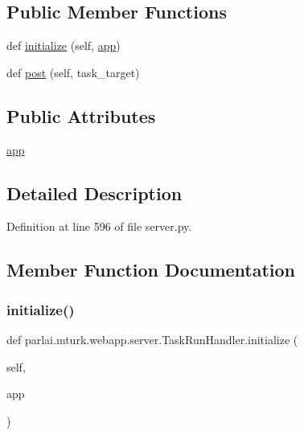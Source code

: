 \subsection*{Public Member Functions}
\begin{DoxyCompactItemize}
\item 
def \hyperlink{classparlai_1_1mturk_1_1webapp_1_1server_1_1TaskRunHandler_a110db01a938080c447a64b5a70918e25}{initialize} (self, \hyperlink{classparlai_1_1mturk_1_1webapp_1_1server_1_1TaskRunHandler_ae9e57d3ffed2fe707e9b1b041e65c2b7}{app})
\item 
def \hyperlink{classparlai_1_1mturk_1_1webapp_1_1server_1_1TaskRunHandler_a957a29eb2fcfec6fba5890470387e1d0}{post} (self, task\+\_\+target)
\end{DoxyCompactItemize}
\subsection*{Public Attributes}
\begin{DoxyCompactItemize}
\item 
\hyperlink{classparlai_1_1mturk_1_1webapp_1_1server_1_1TaskRunHandler_ae9e57d3ffed2fe707e9b1b041e65c2b7}{app}
\end{DoxyCompactItemize}


\subsection{Detailed Description}


Definition at line 596 of file server.\+py.



\subsection{Member Function Documentation}
\mbox{\label{classparlai_1_1mturk_1_1webapp_1_1server_1_1TaskRunHandler_a110db01a938080c447a64b5a70918e25}} 
\subsubsection{\texorpdfstring{initialize()}{initialize()}}
{\footnotesize\ttfamily def parlai.\+mturk.\+webapp.\+server.\+Task\+Run\+Handler.\+initialize (\begin{DoxyParamCaption}\item[{}]{self,  }\item[{}]{app }\end{DoxyParamCaption})}



